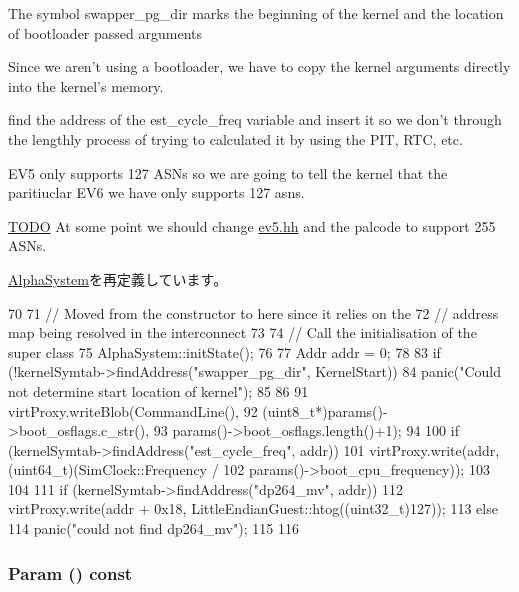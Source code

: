 The symbol swapper\_\-pg\_\-dir marks the beginning of the kernel and the location of bootloader passed arguments

Since we aren't using a bootloader, we have to copy the kernel arguments directly into the kernel's memory.

find the address of the est\_\-cycle\_\-freq variable and insert it so we don't through the lengthly process of trying to calculated it by using the PIT, RTC, etc.

EV5 only supports 127 ASNs so we are going to tell the kernel that the paritiuclar EV6 we have only supports 127 asns. \begin{Desc}
\item[\hyperlink{todo__todo000001}{TODO}]At some point we should change \hyperlink{ev5_8hh}{ev5.hh} and the palcode to support 255 ASNs. \end{Desc}


\hyperlink{classAlphaSystem_a3c34ea9b29f410748d4435a667484924}{AlphaSystem}を再定義しています。


\begin{DoxyCode}
70 {
71     // Moved from the constructor to here since it relies on the
72     // address map being resolved in the interconnect
73 
74     // Call the initialisation of the super class
75     AlphaSystem::initState();
76 
77     Addr addr = 0;
78 
83     if (!kernelSymtab->findAddress("swapper_pg_dir", KernelStart)) {
84         panic("Could not determine start location of kernel");
85     }
86 
91     virtProxy.writeBlob(CommandLine(),
92                         (uint8_t*)params()->boot_osflags.c_str(),
93                         params()->boot_osflags.length()+1);
94 
100     if (kernelSymtab->findAddress("est_cycle_freq", addr))
101         virtProxy.write(addr, (uint64_t)(SimClock::Frequency /
102                                          params()->boot_cpu_frequency));
103 
104 
111     if (kernelSymtab->findAddress("dp264_mv", addr))
112         virtProxy.write(addr + 0x18, LittleEndianGuest::htog((uint32_t)127));
113     else
114         panic("could not find dp264_mv\n");
115 
116 }
\end{DoxyCode}
\hypertarget{classLinuxAlphaSystem_a0df930196034a157336cf5c0b8c62619}{
\subsubsection[{Param}]{ Param () const}}
\label{classLinuxAlphaSystem_a0df930196034a157336cf5c0b8c62619}



